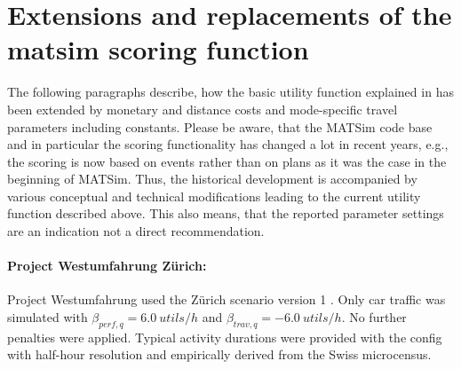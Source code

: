 %

\section{Extensions and replacements of the \acrshort{matsim} scoring function}
\label{sec:utfextensions}
The following paragraphs describe, how the basic utility function explained in \citet[][]{CharyparNagel_Transportation_2005} has been extended by monetary and distance costs and mode-specific travel parameters including constants. Please be aware, that the MATSim code base and in particular the scoring functionality has changed a lot in recent years, e.g.,\,the scoring is now based on events rather than on plans as it was the case in the beginning of MATSim. Thus, the historical development is accompanied by various conceptual and technical modifications leading to the current utility function described above. This also means, that the reported parameter settings are an indication not a direct recommendation.

\paragraph{Project Westumfahrung Zürich:}
Project Westumfahrung \citep[][]{BalmerEtAl_ResRep_bdktzrh_2009} used the Zürich scenario version 1 \citep[][]{HorniEtAl_TechRep_IVT_2011_a}. Only car traffic was simulated with $\beta_{perf,q}=6.0\ utils/h$ and $\beta_{trav,q}=-6.0\  utils/h$. No further penalties were applied. Typical activity durations were provided with the config with half-hour resolution and empirically derived from the Swiss microcensus.

